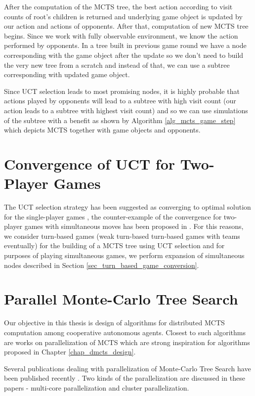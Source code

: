 After the computation of the MCTS tree, the best action according to visit counts of root's
children is returned and underlying game object is updated by our action and actions of
opponents. After that, computation of new MCTS tree begins. Since we work with fully observable
environment, we know the action performed by opponents. In a tree built in previous game round
we have a node corresponding with the game object after the update so we don't need to build
the very new tree from a scratch and instead of that, we can use a subtree corresponding with
updated game object.

Since UCT selection leads to most promising nodes, it is highly probable
that actions played by opponents will lead to a subtree with high visit count (our action leads
to a subtree with highest visit count) and so we can use simulations of the subtree with a
benefit as shown by Algorithm \ref{alg_mcts_game_step} which depicts MCTS together with game
objects and opponents.


\section{Convergence of UCT for Two-Player Games}
\label{sec_minimax_convergence}

The UCT selection strategy has been suggested as converging to optimal solution for the
single-player games \cite{Kocsis2006}, the counter-example of the convergence for two-player
games with simultaneous moves has been proposed in \cite{Shafiei2009}. For this reasons, we
consider turn-based games (weak turn-based turn-based games with teams eventually) for the 
building of a MCTS tree using UCT
selection and for purposes of playing simultaneous games, we perform expansion of simultaneous
nodes described in Section \ref{sec_turn_based_game_conversion}.




\section{Parallel Monte-Carlo Tree Search}
\label{sec_parallel_mcts}

Our objective in this thesis is design of algorithms for distributed MCTS computation among
cooperative autonomous agents. Closest to such algorithms are works on parallelization of MCTS 
which are
strong inspiration for algorithms proposed in Chapter \ref{chap_dmcts_design}.

Several publications dealing with parallelization of Monte-Carlo Tree Search have been published
recently \cites{Cazenave2007}{Chaslot2008}{Teytaud2008}. Two kinds of the parallelization are
discussed in these papers - multi-core parallelization and cluster parallelization.

